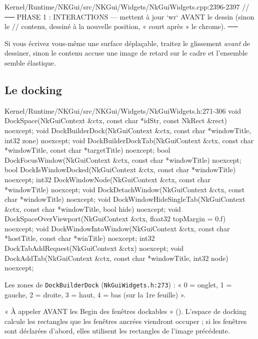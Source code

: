 \begin{nkpiege}
\begin{nkcode}{Kernel/Runtime/NKGui/src/NKGui/Widgets/NkGuiWidgets.cpp:2396-2397}
// ── PHASE 1 : INTERACTIONS — mettent à jour `wr` AVANT le dessin (sinon le
//    contenu, dessiné à la nouvelle position, « court après » le chrome). ──
\end{nkcode}
Si vous écrivez vous-même une surface déplaçable, traitez le glissement
\emph{avant} de dessiner, sinon le contenu accuse une image de retard sur le
cadre et l'ensemble semble élastique.
\end{nkpiege}

\subsection{Le docking}

\begin{nkcode}{Kernel/Runtime/NKGui/src/NKGui/Widgets/NkGuiWidgets.h:271-306}
void  DockSpace(NkGuiContext &ctx, const char *idStr, const NkRect &rect) noexcept;
void  DockBuilderDock(NkGuiContext &ctx, const char *windowTitle, int32 zone) noexcept;
void  DockBuilderDockTab(NkGuiContext &ctx, const char *windowTitle, const char *targetTitle) noexcept;
bool  DockFocusWindow(NkGuiContext &ctx, const char *windowTitle) noexcept;
bool  DockIsWindowDocked(NkGuiContext &ctx, const char *windowTitle) noexcept;
int32 DockWindowNode(NkGuiContext &ctx, const char *windowTitle) noexcept;
void  DockDetachWindow(NkGuiContext &ctx, const char *windowTitle) noexcept;
void  DockWindowHideSingleTab(NkGuiContext &ctx, const char *windowTitle, bool hide) noexcept;
void  DockSpaceOverViewport(NkGuiContext &ctx, float32 topMargin = 0.f) noexcept;
void  DockWindowIntoWindow(NkGuiContext &ctx, const char *hostTitle, const char *winTitle) noexcept;
int32 DockTabAddRequest(NkGuiContext &ctx) noexcept;
void  DockAddTab(NkGuiContext &ctx, const char *windowTitle, int32 node) noexcept;
\end{nkcode}

Les zones de \texttt{DockBuilderDock} (\texttt{NkGuiWidgets.h:273}) : « 0 =
onglet, 1 = gauche, 2 = droite, 3 = haut, 4 = bas (sur la 1re feuille) ».

\begin{nkpiege}
« À appeler AVANT les Begin des fenêtres dockables »
(). L'espace de docking calcule les rectangles
que les fenêtres ancrées viendront occuper ; si les fenêtres sont déclarées
d'abord, elles utilisent les rectangles de l'image précédente.
\end{nkpiege}

